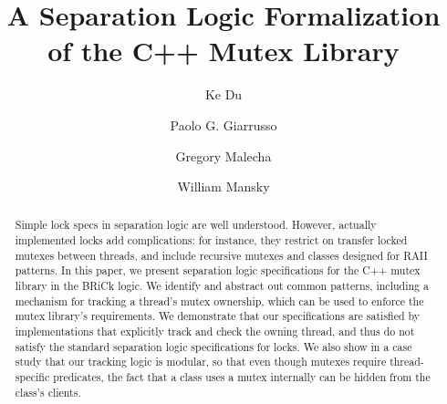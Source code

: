 \documentclass[acmsmall,screen,review,anonymous]{acmart}
\begin{document}
\title{A Separation Logic Formalization of the C++ Mutex Library}

\author{Ke Du}

\author{Paolo G. Giarrusso}

\author{Gregory Malecha}

\author{William Mansky}

\renewcommand{\shortauthors}{Du et al.}

\newcommand{\dolock}[3]{\ensuremath{\mathsf{do\_lock}(#1, #2, #3)}}
\newcommand{\dounlock}[3]{\ensuremath{\mathsf{do\_unlock}(#1, #2, #3)}}

\begin{abstract}
Simple lock specs in separation logic are well understood. However, actually implemented locks add complications: for instance, they restrict on transfer locked mutexes between threads, and include recursive mutexes and classes designed for RAII patterns. In this paper, we present separation logic specifications for the C++ mutex library in the BRiCk logic. We identify and abstract out common patterns, including a mechanism for tracking a thread's mutex ownership, which can be used to enforce the mutex library's requirements. We demonstrate that our specifications are satisfied by implementations that explicitly track and check the owning thread, and thus do not satisfy the standard separation logic specifications for locks. We also show in a case study that our tracking logic is modular, so that even though mutexes require thread-specific predicates, the fact that a class uses a mutex internally can be hidden from the class's clients. %
\end{abstract}
\end{document}
